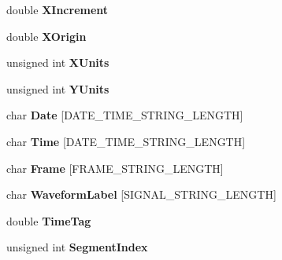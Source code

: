 \begin{DoxyCompactItemize}
\item 
\hypertarget{structAgilentWaveformHeaderTag_ac9d97bfda64eeb66165a08ea4cd0f7ec}{
double {\bfseries XIncrement}}
\label{structAgilentWaveformHeaderTag_ac9d97bfda64eeb66165a08ea4cd0f7ec}

\item 
\hypertarget{structAgilentWaveformHeaderTag_a14c74140afb5be099624763a22b67609}{
double {\bfseries XOrigin}}
\label{structAgilentWaveformHeaderTag_a14c74140afb5be099624763a22b67609}

\item 
\hypertarget{structAgilentWaveformHeaderTag_a0741ac144e52278a195dbc38d51eaef5}{
unsigned int {\bfseries XUnits}}
\label{structAgilentWaveformHeaderTag_a0741ac144e52278a195dbc38d51eaef5}

\item 
\hypertarget{structAgilentWaveformHeaderTag_a388c0045b0686ea6929739c2fc511817}{
unsigned int {\bfseries YUnits}}
\label{structAgilentWaveformHeaderTag_a388c0045b0686ea6929739c2fc511817}

\item 
\hypertarget{structAgilentWaveformHeaderTag_a58d4f52f2bdd3bb000906a59db24a8f0}{
char {\bfseries Date} \mbox{[}DATE\_\-TIME\_\-STRING\_\-LENGTH\mbox{]}}
\label{structAgilentWaveformHeaderTag_a58d4f52f2bdd3bb000906a59db24a8f0}

\item 
\hypertarget{structAgilentWaveformHeaderTag_ace85068b8fd2fabf1549457c1ba73d94}{
char {\bfseries Time} \mbox{[}DATE\_\-TIME\_\-STRING\_\-LENGTH\mbox{]}}
\label{structAgilentWaveformHeaderTag_ace85068b8fd2fabf1549457c1ba73d94}

\item 
\hypertarget{structAgilentWaveformHeaderTag_ac0a0bccaaa10eb61529bdda36d8958cf}{
char {\bfseries Frame} \mbox{[}FRAME\_\-STRING\_\-LENGTH\mbox{]}}
\label{structAgilentWaveformHeaderTag_ac0a0bccaaa10eb61529bdda36d8958cf}

\item 
\hypertarget{structAgilentWaveformHeaderTag_afae7c6ea2eda5b9ce3225073e66fd40d}{
char {\bfseries WaveformLabel} \mbox{[}SIGNAL\_\-STRING\_\-LENGTH\mbox{]}}
\label{structAgilentWaveformHeaderTag_afae7c6ea2eda5b9ce3225073e66fd40d}

\item 
\hypertarget{structAgilentWaveformHeaderTag_ac87bcdec25ae440522cf95498c1ae668}{
double {\bfseries TimeTag}}
\label{structAgilentWaveformHeaderTag_ac87bcdec25ae440522cf95498c1ae668}

\item 
\hypertarget{structAgilentWaveformHeaderTag_a862f00dfb7691ff91b69ed894e78ad4a}{
unsigned int {\bfseries SegmentIndex}}
\label{structAgilentWaveformHeaderTag_a862f00dfb7691ff91b69ed894e78ad4a}

\end{DoxyCompactItemize}


